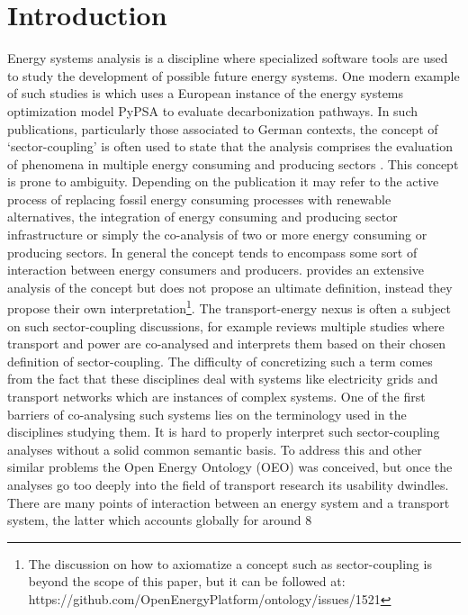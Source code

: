 ﻿\section{Introduction}
\label{introduction}
Energy systems analysis is a discipline where specialized software tools are
used to study the development of possible future energy systems. One modern
example of such studies is \cite{Victoria.2022} which uses a European instance
of the energy systems optimization model PyPSA \cite{Brown.2018} to evaluate
decarbonization pathways. In such publications, particularly those associated to
German contexts, the concept of `sector-coupling' is often used to state that
the analysis comprises the evaluation of phenomena in multiple energy consuming
and producing sectors \cite{Fridgen.2020}. This concept is prone to ambiguity.
Depending on the publication it may refer to the active process of replacing
fossil energy consuming processes with renewable alternatives, the integration
of energy consuming and producing sector infrastructure or simply the
co-analysis of two or more energy consuming or producing sectors. In general the
concept tends to encompass some sort of interaction between energy consumers and
producers. \cite{Ramsebner.2021} provides an extensive analysis of the concept
but does not propose an ultimate definition, instead they propose their own
interpretation\footnote{The discussion on how to axiomatize a concept such as
sector-coupling is beyond the scope of this paper, but it can be followed at:
https://github.com/OpenEnergyPlatform/ontology/issues/1521}. The
transport-energy nexus is often a subject on such sector-coupling discussions,
for example \cite{Robinius.2017} reviews multiple studies where transport and
power are co-analysed and interprets them based on their chosen definition of
sector-coupling. The difficulty of concretizing such a term comes from the fact
that these disciplines deal with systems like electricity grids and transport
networks which are instances of complex systems. One of the first barriers of
co-analysing  such systems lies on the terminology used in the disciplines
studying them. It is hard to properly interpret such sector-coupling analyses
without a solid common semantic basis. To address this and other similar
problems the Open Energy Ontology (OEO) \cite{Booshehri.2021} was conceived, but
once the analyses go too deeply into the field of transport research its
usability dwindles. There are many points of interaction between an energy
system and a transport system, the latter which accounts globally for around 8
